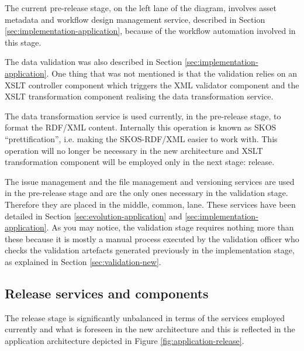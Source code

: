	The current pre-release stage, on the left lane of the diagram, involves asset metadata and workflow design management service, described in Section \ref{sec:implementation-application}, because of the workflow automation involved in this stage. 
	
	The data validation was also described in Section \ref{sec:implementation-application}. One thing that was not mentioned is that the validation relies on an XSLT \citep{xslt3-Kay} controller component which triggers the XML validator component and the XSLT transformation component realising the data transformation service.
	
	The data transformation service is used currently, in the pre-release stage, to format the RDF/XML content. Internally this operation is known as SKOS ``prettification'', i.e. making the SKOS-RDF/XML easier to work with. This operation will no longer be necessary in the new architecture and XSLT transformation component will be employed only in the next stage: release.
	
	The issue management and the file management and versioning services are used in the pre-release stage and are the only ones necessary in the validation stage. Therefore they are placed in the middle, common, lane. These services have been detailed in Section \ref{sec:evolution-application} and \ref{sec:implementation-application}. As you may notice, the validation stage requires nothing more than these because it is mostly a manual process executed by the validation officer who checks the validation artefacts generated previously in the implementation stage, as explained in Section \ref{sec:validation-new}.	

	\subsection{Release services and components}
	\label{sec:release-application}	
	
	The release stage is significantly unbalanced in terms of the services employed currently and what is foreseen in the new architecture and this is reflected in the application architecture depicted in Figure \ref{fig:application-release}. 
	
